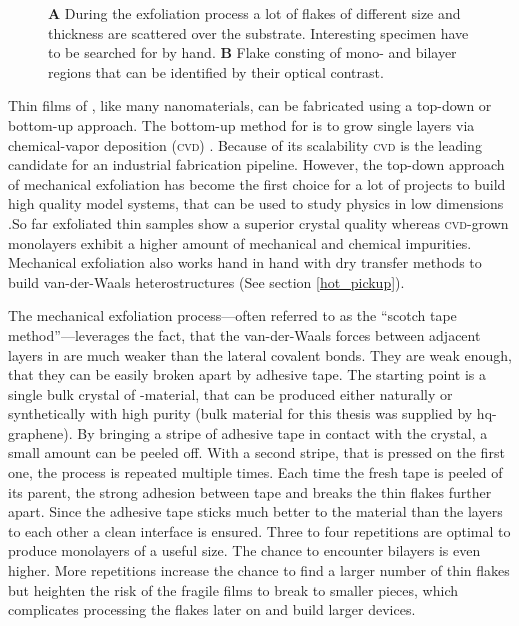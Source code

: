 \begin{figure}
\begin{subfigure}{0.349\textwidth}
\end{subfigure}
\caption{\textbf{A} During the exfoliation process a lot of flakes of different size and thickness are scattered over the substrate. Interesting specimen have to be searched for by hand. \textbf{B} Flake consting of mono- and bilayer regions that can be identified by their optical contrast.}
	\label{flakes}
\end{figure}

Thin films of \tmds\!, like many nanomaterials, can be fabricated using a top-down or bottom-up approach. The bottom-up method for \tmds is to grow single layers via chemical-vapor deposition (\textsc{cvd}) \cite{chen_chemical_2016}. Because of its scalability \textsc{cvd} is the leading candidate for an industrial fabrication pipeline. However, the top-down approach of mechanical exfoliation has become the first choice for a lot of projects to build high quality model systems, that can be used to study physics in low dimensions \cite{geim_rise_2007}.So far exfoliated thin \tmdg samples show a superior crystal quality whereas \textsc{cvd}-grown monolayers exhibit a higher amount of mechanical and chemical impurities. Mechanical exfoliation also works hand in hand with dry transfer methods to build van-der-Waals heterostructures (See section \ref{hot_pickup}). 

The mechanical exfoliation process---often referred to as the ``scotch tape method''---leverages the fact, that the van-der-Waals forces between adjacent layers in \tmds are much weaker than the lateral covalent bonds. They are weak enough, that they can be easily broken apart by adhesive tape. The starting point is a single bulk crystal of \tmd-material, that can be produced either naturally or synthetically with high purity (bulk material for this thesis was supplied by hq-graphene). By bringing a stripe of adhesive tape in contact with the crystal, a small amount can be peeled off. With a second stripe, that is pressed on the first one, the process is repeated multiple times. Each time the fresh tape is peeled of its parent, the strong adhesion between tape and \tmdg breaks the thin flakes further apart. Since the adhesive tape sticks much better to the material than the layers to each other a clean interface is ensured. Three to four repetitions are optimal to produce monolayers of a useful size. The chance to encounter bilayers is even higher. More repetitions increase the chance to find a larger number of thin flakes but heighten the risk of the fragile films to break to smaller pieces, which complicates processing the flakes later on and build larger devices. 

